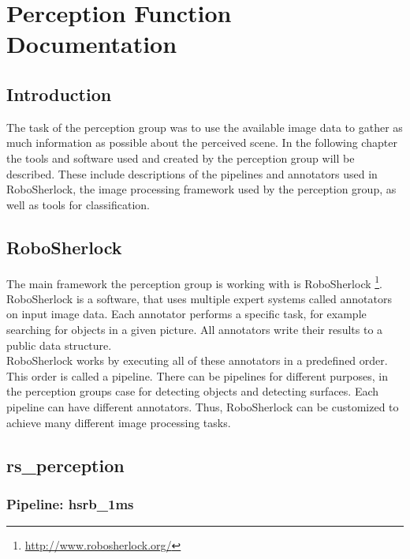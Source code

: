\documentclass[main.tex]{subfiles}
\begin{document}
\begingroup

\renewcommand{\cleardoublepage}{}

\renewcommand{\clearpage}{}
\newpage
\chapter{Perception Function Documentation}

\section{Introduction}
The task of the perception group was to use the available image data to gather as much information as possible about the perceived scene. In the following chapter the tools and software used and created by the perception group will be described. These include descriptions of the pipelines and annotators used in RoboSherlock, the image processing framework used by the perception group, as well as tools for classification.

\section{RoboSherlock}
The main framework the perception group is working with is RoboSherlock \footnote{\url{http://www.robosherlock.org/}}. RoboSherlock is a software, that uses multiple expert systems called annotators on input image data. Each annotator performs a specific task, for example searching for objects in a given picture. All annotators write their results to a public data structure.\\
		
RoboSherlock works by executing all of these annotators in a predefined order. This order is called a pipeline. There can be pipelines for different purposes, in the perception groups case for detecting objects and detecting surfaces. Each pipeline can have different annotators. Thus, RoboSherlock can be customized to achieve many different image processing tasks.

		\section{rs\_perception}
			\subsection{Pipeline: hsrb\_1ms}
\end{document}
